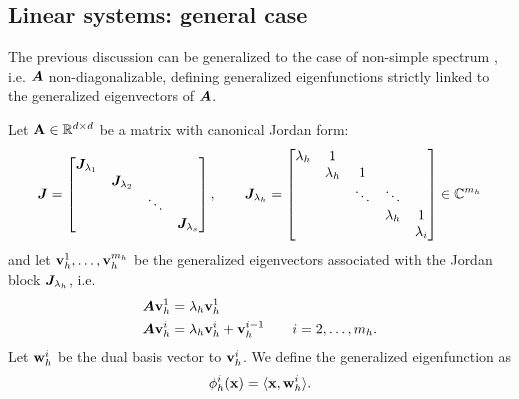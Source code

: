 \subsection{Linear systems: general case}
The previous discussion can be generalized to the case of non-simple spectrum \cite{mezic_spectrum_2019}, i.e. $\vb*{A}$ non-diagonalizable, defining generalized eigenfunctions strictly linked to the generalized eigenvectors of $\vb*{A}$.
\begin{definition}
\label{gen_eigenfunction_def}
Let $\vb{A}\in\mathbb{R}^{d\times d}$ be a matrix with canonical Jordan form:
\begin{equation*}
    \vb*{J} = 
    \begin{bmatrix}
    \vb*{J}_{\lambda_1} & & & \\
    & \vb*{J}_{\lambda_2} & & \\
    & & \ddots & \\
    & & & \vb*{J}_{\lambda_s} \\
    \end{bmatrix}, \qquad 
    \vb*{J}_{\lambda_h} =
    \begin{bmatrix}
    \lambda_h & 1 & & & \\
    & \lambda_h & 1 & & \\
    & & \ddots &\ddots & \\
    & & & \lambda_h & 1\\
    & & & & \lambda_i \\
    \end{bmatrix} \in \mathbb{C}^{m_h}
\end{equation*}
and let $\vb{v}_h^1,\dots, \vb{v}_h^{m_h}$ be the generalized eigenvectors associated with the Jordan block $\vb*{J}_{\lambda_h}$, i.e.
\begin{equation*}
    \begin{split}
        \vb*{A}\vb{v}_h^1 &= \lambda_h \vb{v}_h^1 \\
        \vb*{A}\vb{v}_h^i &= \lambda_h \vb{v}_h^i + \vb{v}_h^{i-1} \qquad i = 2,\dots,m_h. 
    \end{split}
\end{equation*}
Let $\vb{w}_h^i$ be the dual basis vector to $\vb{v}_h^i$. We define the generalized eigenfunction as
\begin{equation}
    \phi_h^i(\vb{x}) = \langle \vb{x}, \vb{w}_h^i \rangle.
\end{equation}
\end{definition}

